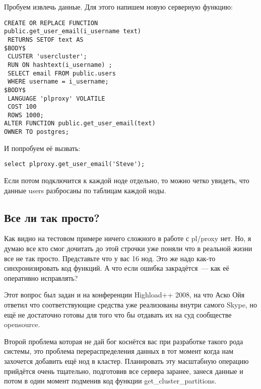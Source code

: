 Пробуем извлечь данные.
Для этого напишем новую серверную функцию: 
\begin{verbatim}
CREATE OR REPLACE FUNCTION 
public.get_user_email(i_username text)
 RETURNS SETOF text AS
$BODY$
 CLUSTER 'usercluster';
 RUN ON hashtext(i_username) ;
 SELECT email FROM public.users 
 WHERE username = i_username;
$BODY$
 LANGUAGE 'plproxy' VOLATILE
 COST 100
 ROWS 1000;
ALTER FUNCTION public.get_user_email(text) 
OWNER TO postgres;
\end{verbatim}

И попробуем её вызвать:
\begin{verbatim}
select plproxy.get_user_email('Steve');
\end{verbatim}

Если потом подключится к каждой ноде отдельно, то можно четко увидеть, что данные users разбросаны по таблицам каждой ноды.

\subsection{Все ли так просто?}
Как видно на тестовом примере ничего сложного в работе с pl/proxy нет. 
Но, я думаю все кто смог дочитать до этой строчки уже поняли что в реальной жизни все не так просто.
Представьте что у вас 16 нод. Это же надо как-то синхронизировать код функций. А что если ошибка закрадётся~--- 
как её оперативно исправлять?

Этот вопрос был задан и на конференции Highload++ 2008, на что Аско Ойя ответил что соответствующие средства 
уже реализованы внутри самого Skype, но ещё не достаточно готовы для того что бы отдавать их на суд сообществе opensource.

Второй проблема которая не дай бог коснётся вас при разработке такого рода системы, это проблема перераспределения данных 
в тот момент когда нам захочется добавить ещё нод в кластер.
Планировать эту масштабную операцию прийдётся очень тщательно, подготовив все сервера заранее, 
занеся данные и потом в один момент подменив код функции get\_cluster\_partitions.